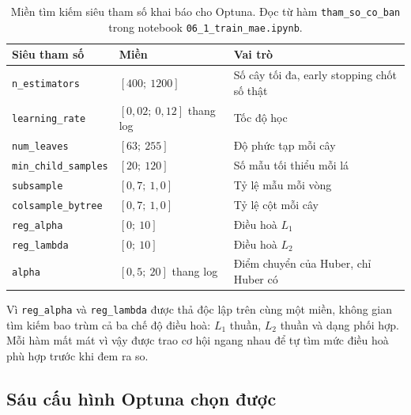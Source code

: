 \documentclass[12pt, a4paper]{report}
\begin{document}
\begin{table}[htbp]
\centering
\caption{Miền tìm kiếm siêu tham số khai báo cho Optuna. Đọc từ hàm \texttt{tham\_so\_co\_ban} trong
notebook \texttt{06\_1\_train\_mae.ipynb}.}
\label{tab:mien_optuna}
\small
\begin{tabular}{l l l}
\toprule
\textbf{Siêu tham số} & \textbf{Miền} & \textbf{Vai trò} \\
\midrule
\texttt{n\_estimators}     & $[400;\ 1200]$ & Số cây tối đa, early stopping chốt số thật \\
\texttt{learning\_rate}    & $[0{,}02;\ 0{,}12]$ thang log & Tốc độ học \\
\texttt{num\_leaves}       & $[63;\ 255]$ & Độ phức tạp mỗi cây \\
\texttt{min\_child\_samples} & $[20;\ 120]$ & Số mẫu tối thiểu mỗi lá \\
\texttt{subsample}         & $[0{,}7;\ 1{,}0]$ & Tỷ lệ mẫu mỗi vòng \\
\texttt{colsample\_bytree} & $[0{,}7;\ 1{,}0]$ & Tỷ lệ cột mỗi cây \\
\texttt{reg\_alpha}        & $[0;\ 10]$ & Điều hoà $L_1$ \\
\texttt{reg\_lambda}       & $[0;\ 10]$ & Điều hoà $L_2$ \\
\texttt{alpha}             & $[0{,}5;\ 20]$ thang log & Điểm chuyển của Huber, chỉ Huber có \\
\bottomrule
\end{tabular}
\end{table}

Vì \texttt{reg\_alpha} và \texttt{reg\_lambda} được thả độc lập trên cùng một miền, không gian
tìm kiếm bao trùm cả ba chế độ điều hoà: $L_1$ thuần, $L_2$ thuần và dạng phối hợp. Mỗi hàm mất
mát vì vậy được trao cơ hội ngang nhau để tự tìm mức điều hoà phù hợp trước khi đem ra so.

\FloatBarrier
\subsection{Sáu cấu hình Optuna chọn được}
\end{document}
